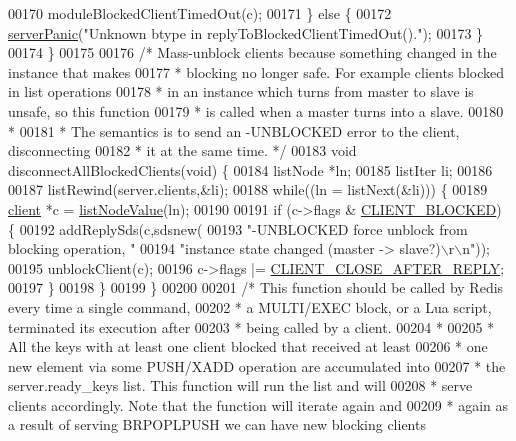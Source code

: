 \begin{DoxyCode}
00170         moduleBlockedClientTimedOut(c);
00171     \} \textcolor{keywordflow}{else} \{
00172         \hyperlink{server_8h_a11cc378e7778a830b41240578de3b204}{serverPanic}(\textcolor{stringliteral}{"Unknown btype in replyToBlockedClientTimedOut()."});
00173     \}
00174 \}
00175 
00176 \textcolor{comment}{/* Mass-unblock clients because something changed in the instance that makes}
00177 \textcolor{comment}{ * blocking no longer safe. For example clients blocked in list operations}
00178 \textcolor{comment}{ * in an instance which turns from master to slave is unsafe, so this function}
00179 \textcolor{comment}{ * is called when a master turns into a slave.}
00180 \textcolor{comment}{ *}
00181 \textcolor{comment}{ * The semantics is to send an -UNBLOCKED error to the client, disconnecting}
00182 \textcolor{comment}{ * it at the same time. */}
00183 \textcolor{keywordtype}{void} disconnectAllBlockedClients(\textcolor{keywordtype}{void}) \{
00184     listNode *ln;
00185     listIter li;
00186 
00187     listRewind(server.clients,&li);
00188     \textcolor{keywordflow}{while}((ln = listNext(&li))) \{
00189         \hyperlink{structclient}{client} *c = \hyperlink{adlist_8h_af84cae230e7180ebcda1e2736fce9f65}{listNodeValue}(ln);
00190 
00191         \textcolor{keywordflow}{if} (c->flags & \hyperlink{server_8h_a503ad979164a52f0f5e2a63e4c7da3a0}{CLIENT\_BLOCKED}) \{
00192             addReplySds(c,sdsnew(
00193                 \textcolor{stringliteral}{"-UNBLOCKED force unblock from blocking operation, "}
00194                 \textcolor{stringliteral}{"instance state changed (master -> slave?)\(\backslash\)r\(\backslash\)n"}));
00195             unblockClient(c);
00196             c->flags |= \hyperlink{server_8h_a8cff2154afcc2e87ac85bdbbe2814091}{CLIENT\_CLOSE\_AFTER\_REPLY};
00197         \}
00198     \}
00199 \}
00200 
00201 \textcolor{comment}{/* This function should be called by Redis every time a single command,}
00202 \textcolor{comment}{ * a MULTI/EXEC block, or a Lua script, terminated its execution after}
00203 \textcolor{comment}{ * being called by a client.}
00204 \textcolor{comment}{ *}
00205 \textcolor{comment}{ * All the keys with at least one client blocked that received at least}
00206 \textcolor{comment}{ * one new element via some PUSH/XADD operation are accumulated into}
00207 \textcolor{comment}{ * the server.ready\_keys list. This function will run the list and will}
00208 \textcolor{comment}{ * serve clients accordingly. Note that the function will iterate again and}
00209 \textcolor{comment}{ * again as a result of serving BRPOPLPUSH we can have new blocking clients}

\end{DoxyCode}
